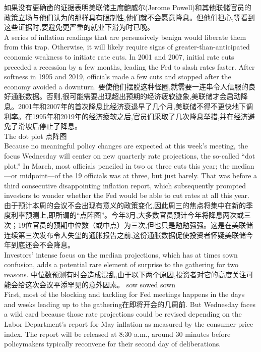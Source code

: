 \documentclass[a4paper,12pt]{article}
\begin{document}
如果没有更确凿的证据表明美联储主席鲍威尔(Jerome Powell)和其他联储官员的政策立场与他们认为的那样具有限制性,他们就不会愿意降息。但他们担心,等看到这些证据时,要避免更严重的就业下滑为时已晚。
\\A series of inflation readings that are persuasively benign would liberate them from this trap. Otherwise, it will likely require signs of greater-than-anticipated economic weakness to initiate rate cuts. In 2001 and 2007, initial rate cuts preceded a recession by a few months, leading the Fed to slash rates faster. After softness in 1995 and 2019, officials made a few cuts and stopped after the economy avoided a downturn. 
要使他们摆脱这种怪圈,就需要一连串令人信服的良好通胀数据。否则,很可能需要出现超出预期的经济疲软迹象,美联储才会启动降息。2001年和2007年的首次降息比经济衰退早了几个月,美联储不得不更快地下调利率。在1995年和2019年的经济疲软之后,官员们采取了几次降息举措,并在经济避免了滑坡后停止了降息。
\\The dot plot 点阵图 
\\Because no meaningful policy changes are expected at this week's meeting, the focus Wednesday will center on new quarterly rate projections, the so-called “dot plot.” In March, most officials penciled in two or three cuts this year; the median—or midpoint—of the 19 officials was at three, but just barely. That was before a third consecutive disappointing inflation report, which subsequently prompted investors to wonder whether the Fed would be able to cut rates at all this year. 
由于预计本周的会议不会出现有意义的政策变化,因此周三的焦点将集中在新的季度利率预测上,即所谓的“点阵图”。今年3月,大多数官员预计今年将降息两次或三次；19位官员的预期中位数（或中点）为三次,但也只是勉勉强强。这是在美联储连续第三次发布令人失望的通胀报告之前,这份通胀数据促使投资者怀疑美联储今年到底还会不会降息。
\\Investors' intense focus on the median projections, which has at times sown confusion, adds a potential rare element of surprise to the gathering for two reasons. 
中位数预测有时会造成混乱,由于以下两个原因,投资者对它的高度关注可能会给这次会议平添罕见的意外因素。  sow sowed sown
\\First, most of the blocking and tackling for Fed meetings happens in the days and weeks leading up to the gathering在即将开会的几周前. But Wednesday faces a wild card because those rate projections could be revised depending on the Labor Department's report for May inflation as measured by the consumer-price index. The report will be released at 8:30 a.m., around 30 minutes before policymakers typically reconvene for their second day of deliberations. 
\end{document}
